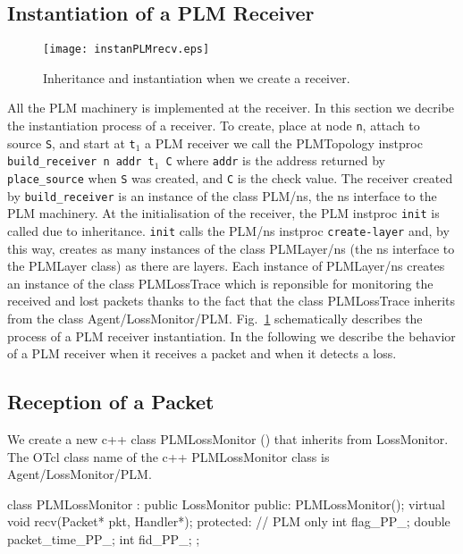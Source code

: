 {\subsection{Instantiation of a PLM Receiver}

\begin{figure}[tbp]
  \centerline{\texttt{[image: instanPLMrecv.eps]}}
  \caption{Inheritance and instantiation when we create a receiver.}
  \label{fig:instanPLMrecv}
\end{figure}

All the PLM machinery is implemented at the receiver. In this section we decribe
the instantiation process of a receiver. To create, place at node
{\tt n},  attach to source {\tt S}, and start at {\tt t$_1$} a PLM receiver we
call the PLMTopology instproc {\tt 
  build\_receiver n addr t$_1$ C} where {\tt addr} is the address returned
by {\tt place\_source} when {\tt S} was created, and {\tt C} is the check value. The
receiver created by {\tt build\_receiver} is an instance of the class PLM/ns,
the ns interface to the PLM 
machinery. At the initialisation of the receiver, the PLM instproc {\tt init} is
called due to inheritance. {\tt init} calls the PLM/ns instproc
{\tt create-layer} and, by this way,  creates as many instances of the class 
PLMLayer/ns (the ns interface to the PLMLayer class) as there are layers. Each
instance of PLMLayer/ns creates an instance of the class PLMLossTrace which is
reponsible for 
monitoring the received and lost packets thanks to the fact that the class
PLMLossTrace inherits from the class Agent/LossMonitor/PLM. 
Fig.~\ref{fig:instanPLMrecv} schematically describes the process  of a PLM
receiver instantiation. In the following we describe the behavior of a PLM
receiver when it receives a packet and when it detects a loss.



\subsection{Reception of a Packet}
\label{sec:PLMReception-Packet}
We create a new c++ class PLMLossMonitor () that
inherits from LossMonitor. The OTcl class name of the c++ PLMLossMonitor class is
Agent/LossMonitor/PLM.
\begin{program}
class PLMLossMonitor : public LossMonitor {
public:
        PLMLossMonitor();
        virtual void recv(Packet* pkt, Handler*);
protected:
        // PLM only
        int flag_PP_;
        double packet_time_PP_;
        int fid_PP_;
};


\end{program}}
